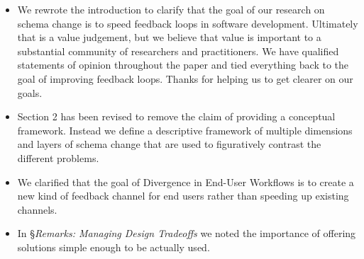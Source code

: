 \documentclass{article}
\begin{document}
\begin{itemize}
  \item We rewrote the introduction to clarify that the goal of our research on schema change is to speed feedback loops in software development. Ultimately that is a value judgement, but we believe that value is important to a substantial community of researchers and practitioners. We have qualified statements of opinion throughout the paper and tied everything back to the goal of improving feedback loops. Thanks for helping us to get clearer on our goals.

  \item Section 2 has been revised to remove the claim of providing a conceptual framework. Instead we define a descriptive framework of multiple dimensions and layers of schema change that are used to figuratively contrast the different problems.



\item We clarified that the goal of Divergence in End-User Workflows is to create a new kind of feedback channel for end users rather than speeding up existing channels.

\item In \S\emph{Remarks: Managing Design Tradeoffs} we noted the importance of offering solutions simple enough to be actually used.
\end{itemize}
\end{document}
